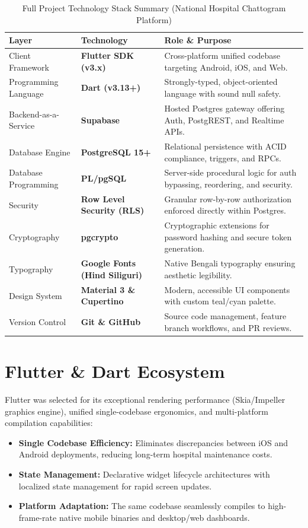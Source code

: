 \documentclass[11pt,a4paper,oneside]{report}
\begin{document}
\begin{table}[H]
\centering
\small
\begin{tabularx}{\textwidth}{lp{4cm}X}
\toprule
\textbf{Layer} & \textbf{Technology} & \textbf{Role \& Purpose} \\
\midrule
Client Framework & \textbf{Flutter SDK (v3.x)} & Cross-platform unified codebase targeting Android, iOS, and Web. \\
Programming Language & \textbf{Dart (v3.13+)} & Strongly-typed, object-oriented language with sound null safety. \\
Backend-as-a-Service & \textbf{Supabase} & Hosted Postgres gateway offering Auth, PostgREST, and Realtime APIs. \\
Database Engine & \textbf{PostgreSQL 15+} & Relational persistence with ACID compliance, triggers, and RPCs. \\
Database Programming & \textbf{PL/pgSQL} & Server-side procedural logic for auth bypassing, reordering, and security. \\
Security & \textbf{Row Level Security (RLS)} & Granular row-by-row authorization enforced directly within Postgres. \\
Cryptography & \textbf{pgcrypto} & Cryptographic extensions for password hashing and secure token generation. \\
Typography & \textbf{Google Fonts (Hind Siliguri)} & Native Bengali typography ensuring aesthetic legibility. \\
Design System & \textbf{Material 3 \& Cupertino} & Modern, accessible UI components with custom teal/cyan palette. \\
Version Control & \textbf{Git \& GitHub} & Source code management, feature branch workflows, and PR reviews. \\
\bottomrule
\end{tabularx}
\caption{Full Project Technology Stack Summary (National Hospital Chattogram Platform)}
\label{tab:tech_stack}
\end{table}

\section{Flutter \& Dart Ecosystem}
Flutter was selected for its exceptional rendering performance (Skia/Impeller graphics engine), unified single-codebase ergonomics, and multi-platform compilation capabilities:
\begin{itemize}
    \item \textbf{Single Codebase Efficiency:} Eliminates discrepancies between iOS and Android deployments, reducing long-term hospital maintenance costs.
    \item \textbf{State Management:} Declarative widget lifecycle architectures with localized state management for rapid screen updates.
    \item \textbf{Platform Adaptation:} The same codebase seamlessly compiles to high-frame-rate native mobile binaries and desktop/web dashboards.
\end{itemize}
\end{document}
